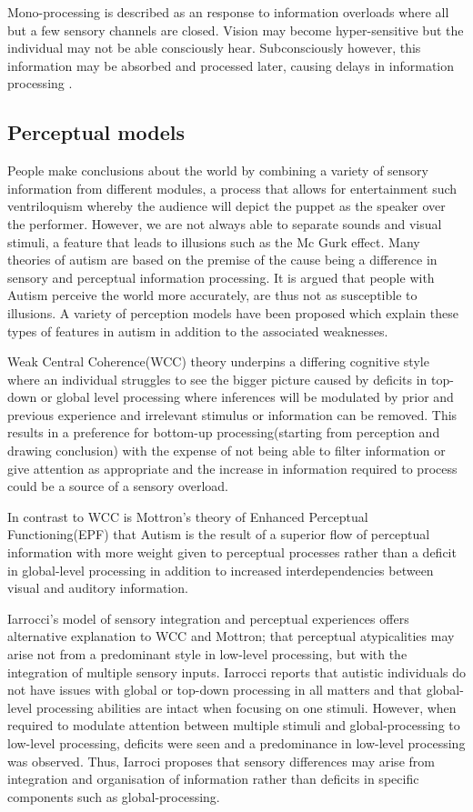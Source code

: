 Mono-processing is described as an response to information overloads where all but a few sensory channels are closed. Vision may become hyper-sensitive but the individual may not be able consciously hear. Subconsciously however, this information may be absorbed and processed later, causing delays in information processing \cite{olgab}.  

\subsection{Perceptual models}

People make conclusions about the world by combining a variety of sensory information from different modules, a process that allows for entertainment such ventriloquism whereby the audience will depict the puppet as the speaker over the performer. However, we are not always able to separate sounds and visual stimuli, a feature that leads to illusions such as the Mc Gurk effect. Many theories of autism are based on the premise of the cause being a difference in sensory and perceptual information processing. It is argued that people with Autism perceive the world more accurately, are thus not as susceptible to illusions. A variety of perception models have been proposed which explain these types of features in autism in addition to the associated weaknesses.  

Weak Central Coherence(WCC) theory underpins a differing cognitive style where an individual struggles to see the bigger picture caused by deficits in top-down or global level processing where inferences will be modulated by prior and previous experience and irrelevant stimulus or information can be removed. This results in a preference for bottom-up processing(starting from perception and drawing conclusion) with the expense of not being able to filter information or give attention as appropriate and the increase in information required to process could be a source of a sensory overload. 

In contrast to WCC is Mottron's theory of Enhanced Perceptual Functioning(EPF) that Autism is the result of a superior flow of perceptual information with more weight given to perceptual processes rather than a deficit in global-level processing 
in addition to increased interdependencies between visual and auditory information. 

Iarrocci’s model of sensory integration and perceptual experiences offers alternative explanation to WCC and Mottron; that perceptual atypicalities may arise not from a predominant style in low-level processing, but with the integration of multiple sensory inputs. Iarrocci reports that autistic individuals do not have issues with global or top-down processing in all matters and that global-level processing abilities are intact when focusing on one stimuli. However, when required to modulate attention between multiple stimuli and global-processing to low-level processing, deficits were seen and a predominance in low-level processing was observed. Thus, Iarroci proposes that sensory differences may arise from integration and organisation of information rather than deficits in specific components such as global-processing.


